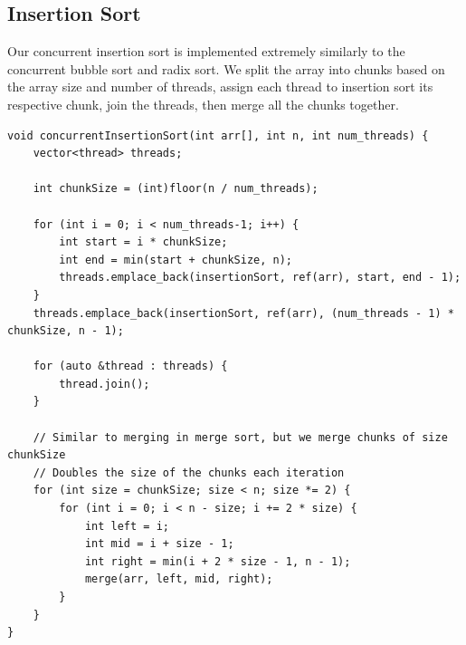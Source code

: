 \documentclass[conference]{IEEEtran}
\begin{document}
\subsection{Insertion Sort}
Our concurrent insertion sort is implemented extremely similarly to the concurrent bubble sort and radix sort. We split the array into chunks based on the array size and number of threads, assign each thread to insertion sort its respective chunk, join the threads, then merge all the chunks together.
\\
\begin{lstlisting}
void concurrentInsertionSort(int arr[], int n, int num_threads) {
    vector<thread> threads;

    int chunkSize = (int)floor(n / num_threads);

    for (int i = 0; i < num_threads-1; i++) {
        int start = i * chunkSize;
        int end = min(start + chunkSize, n);
        threads.emplace_back(insertionSort, ref(arr), start, end - 1);
    }
    threads.emplace_back(insertionSort, ref(arr), (num_threads - 1) * chunkSize, n - 1);    

    for (auto &thread : threads) {
        thread.join();
    }
    
    // Similar to merging in merge sort, but we merge chunks of size chunkSize
    // Doubles the size of the chunks each iteration
    for (int size = chunkSize; size < n; size *= 2) {
        for (int i = 0; i < n - size; i += 2 * size) {
            int left = i;
            int mid = i + size - 1;
            int right = min(i + 2 * size - 1, n - 1);
            merge(arr, left, mid, right);
        }
    }
}
\end{lstlisting}
\end{document}
